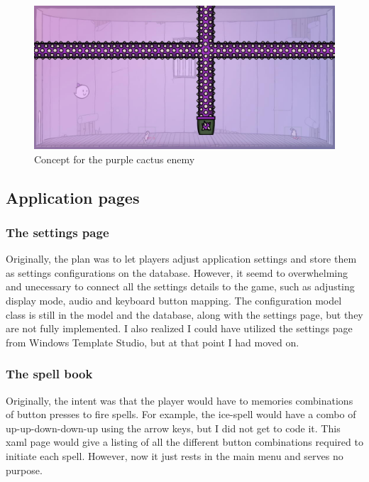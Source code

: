 \documentclass[12pt]{article}
\begin{document}
        \begin{figure}[H]
            \centering
            \includegraphics[scale=0.4]{images/eksempel.jpg}
            \caption{Concept for the purple cactus enemy}
        \end{figure}

    \subsection{Application pages}

        \subsubsection{The settings page}

        Originally, the plan was to let players adjust application settings and store them as settings configurations on the database. However, it seemd to overwhelming and unecessary to connect all the settings details to the game, such as adjusting display mode, audio and keyboard button mapping. The configuration model class is still in the model and the database, along with the settings page, but they are not fully implemented. I also realized I could have utilized the settings page from Windows Template Studio, but at that point I had moved on.

        \subsubsection{The spell book}

        Originally, the intent was that the player would have to memories combinations of button presses to fire spells. For example, the ice-spell would have a combo of up-up-down-down-up using the arrow keys, but I did not get to code it. This xaml page would give a listing of all the different button combinations required to initiate each spell. However, now it just rests in the main menu and serves no purpose.
\end{document}
